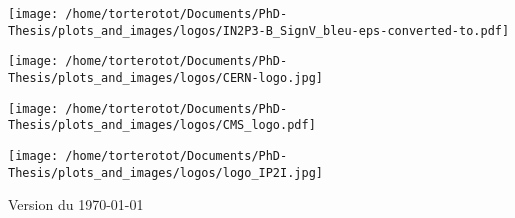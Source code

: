 \begin{center}
\vspace{.5cm}

\begin{minipage}[t]{.225\textwidth}
\begin{center}
\texttt{[image: /home/torterotot/Documents/PhD-Thesis/plots\_and\_images/logos/IN2P3-B\_SignV\_bleu-eps-converted-to.pdf]}
\end{center}
\end{minipage}
\hfill
\begin{minipage}[t]{.225\textwidth}
\begin{center}
\texttt{[image: /home/torterotot/Documents/PhD-Thesis/plots\_and\_images/logos/CERN-logo.jpg]}
\end{center}
\end{minipage}
\hfill
\begin{minipage}[t]{.225\textwidth}
\begin{center}
\texttt{[image: /home/torterotot/Documents/PhD-Thesis/plots\_and\_images/logos/CMS\_logo.pdf]}
\end{center}
\end{minipage}
\hfill
\begin{minipage}[t]{.225\textwidth}
\begin{center}
\texttt{[image: /home/torterotot/Documents/PhD-Thesis/plots\_and\_images/logos/logo\_IP2I.jpg]}
\end{center}
\end{minipage}

\vspace{.25cm}

{\scriptsize Version du \today}
\end{center}